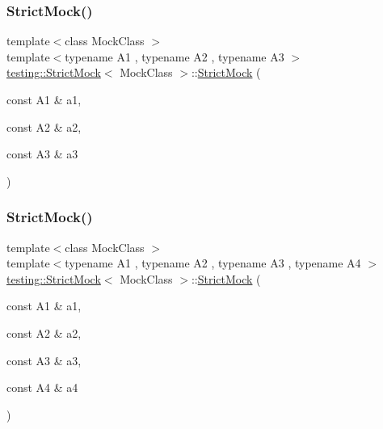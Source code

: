 \mbox{\label{classtesting_1_1_strict_mock_acc25729cd85a3a412106863894a30fe7}} 
\subsubsection{\texorpdfstring{Strict\+Mock()}{StrictMock()}\hspace{0.1cm}{\footnotesize\ttfamily [4/11]}}
{\footnotesize\ttfamily template$<$class Mock\+Class $>$ \\
template$<$typename A1 , typename A2 , typename A3 $>$ \\
\hyperlink{classtesting_1_1_strict_mock}{testing\+::\+Strict\+Mock}$<$ Mock\+Class $>$\+::\hyperlink{classtesting_1_1_strict_mock}{Strict\+Mock} (\begin{DoxyParamCaption}\item[{const A1 \&}]{a1,  }\item[{const A2 \&}]{a2,  }\item[{const A3 \&}]{a3 }\end{DoxyParamCaption})\hspace{0.3cm}{\ttfamily [inline]}}

\mbox{\label{classtesting_1_1_strict_mock_a6b42ef1460901ea91a2a09f44ae8fba2}} 
\subsubsection{\texorpdfstring{Strict\+Mock()}{StrictMock()}\hspace{0.1cm}{\footnotesize\ttfamily [5/11]}}
{\footnotesize\ttfamily template$<$class Mock\+Class $>$ \\
template$<$typename A1 , typename A2 , typename A3 , typename A4 $>$ \\
\hyperlink{classtesting_1_1_strict_mock}{testing\+::\+Strict\+Mock}$<$ Mock\+Class $>$\+::\hyperlink{classtesting_1_1_strict_mock}{Strict\+Mock} (\begin{DoxyParamCaption}\item[{const A1 \&}]{a1,  }\item[{const A2 \&}]{a2,  }\item[{const A3 \&}]{a3,  }\item[{const A4 \&}]{a4 }\end{DoxyParamCaption})\hspace{0.3cm}{\ttfamily [inline]}}

